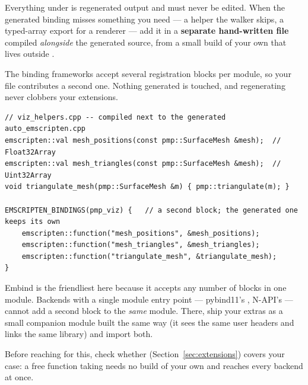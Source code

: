 Everything under  is regenerated output and must never be
edited. When the generated binding misses something you need --- a helper the
walker skips, a typed-array export for a renderer --- add it in a
\textbf{separate hand-written file} compiled \emph{alongside} the generated
source, from a small build of your own that lives outside .

The binding frameworks accept several registration blocks per module, so your
file contributes a second one. Nothing generated is touched, and regenerating
never clobbers your extensions.

\begin{lstlisting}[style=cpp]
// viz_helpers.cpp -- compiled next to the generated auto_emscripten.cpp
emscripten::val mesh_positions(const pmp::SurfaceMesh &mesh);  // Float32Array
emscripten::val mesh_triangles(const pmp::SurfaceMesh &mesh);  // Uint32Array
void triangulate_mesh(pmp::SurfaceMesh &m) { pmp::triangulate(m); }

EMSCRIPTEN_BINDINGS(pmp_viz) {   // a second block; the generated one keeps its own
    emscripten::function("mesh_positions", &mesh_positions);
    emscripten::function("mesh_triangles", &mesh_triangles);
    emscripten::function("triangulate_mesh", &triangulate_mesh);
}
\end{lstlisting}

\begin{warn}
Embind is the friendliest here because it accepts any number of
 blocks in one module. Backends with a single module
entry point --- pybind11's , N-API's
 --- cannot add a second block to the \emph{same}
module. There, ship your extras as a small companion module built the same way
(it sees the same user headers and links the same library) and import both.
\end{warn}

Before reaching for this, check whether 
(Section~\ref{sec:extensions}) covers your case: a free function taking
 needs no build of your own and reaches every backend at once.
